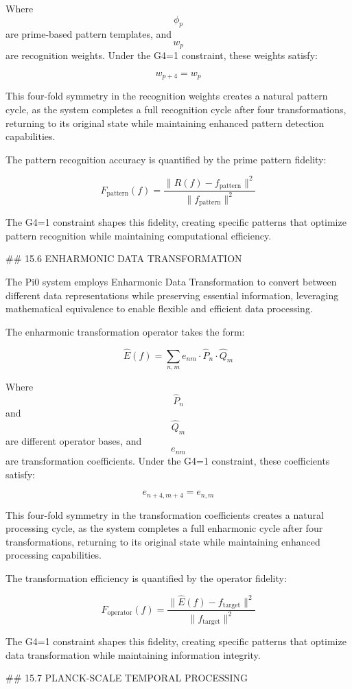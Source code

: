 Where $$ \phi_p $$ are prime-based pattern templates, and $$ w_p $$ are recognition weights. Under the G4=1 constraint, these weights satisfy:

$$ w_{p+4} = w_p $$

This four-fold symmetry in the recognition weights creates a natural pattern cycle, as the system completes a full recognition cycle after four transformations, returning to its original state while maintaining enhanced pattern detection capabilities.

The pattern recognition accuracy is quantified by the prime pattern fidelity:

$$ F_{\text{pattern}}(f) = \frac{\|R(f) - f_{\text{pattern}}\|^2}{\|f_{\text{pattern}}\|^2} $$

The G4=1 constraint shapes this fidelity, creating specific patterns that optimize pattern recognition while maintaining computational efficiency.

## 15.6 ENHARMONIC DATA TRANSFORMATION

The Pi0 system employs Enharmonic Data Transformation to convert between different data representations while preserving essential information, leveraging mathematical equivalence to enable flexible and efficient data processing.

The enharmonic transformation operator takes the form:

$$ \hat{E}(f) = \sum_{n,m} e_{nm} \cdot \hat{P}_n \cdot \hat{Q}_m $$

Where $$ \hat{P}_n $$ and $$ \hat{Q}_m $$ are different operator bases, and $$ e_{nm} $$ are transformation coefficients. Under the G4=1 constraint, these coefficients satisfy:

$$ e_{n+4,m+4} = e_{n,m} $$

This four-fold symmetry in the transformation coefficients creates a natural processing cycle, as the system completes a full enharmonic cycle after four transformations, returning to its original state while maintaining enhanced processing capabilities.

The transformation efficiency is quantified by the operator fidelity:

$$ F_{\text{operator}}(f) = \frac{\|\hat{E}(f) - f_{\text{target}}\|^2}{\|f_{\text{target}}\|^2} $$

The G4=1 constraint shapes this fidelity, creating specific patterns that optimize data transformation while maintaining information integrity.

## 15.7 PLANCK-SCALE TEMPORAL PROCESSING

